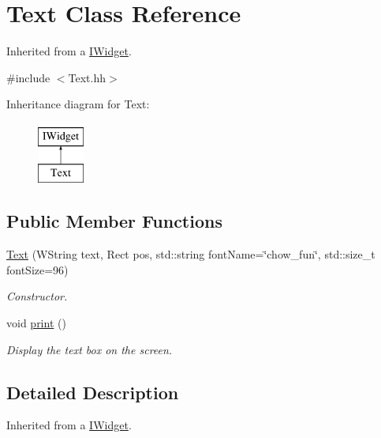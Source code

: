 \hypertarget{classText}{}\section{Text Class Reference}
\label{classText}


Inherited from a \hyperlink{classIWidget}{I\+Widget}.  




{\ttfamily \#include $<$Text.\+hh$>$}

Inheritance diagram for Text\+:\begin{figure}[H]
\begin{center}
\leavevmode
\includegraphics[height=2.000000cm]{classText}
\end{center}
\end{figure}
\subsection*{Public Member Functions}
\begin{DoxyCompactItemize}
\item 
\hyperlink{classText_a00ba9f4a2c3ca172e17433d2ceda4d55}{Text} (W\+String text, Rect pos, std\+::string font\+Name=\char`\"{}chow\+\_\+fun\char`\"{}, std\+::size\+\_\+t font\+Size=96)
\begin{DoxyCompactList}\small\item\em Constructor. \end{DoxyCompactList}\item 
\mbox{\label{classText_a351b37eb3f9f6fd591992245fcb72067}} 
void \hyperlink{classText_a351b37eb3f9f6fd591992245fcb72067}{print} ()
\begin{DoxyCompactList}\small\item\em Display the text box on the screen. \end{DoxyCompactList}\end{DoxyCompactItemize}


\subsection{Detailed Description}
Inherited from a \hyperlink{classIWidget}{I\+Widget}. 

